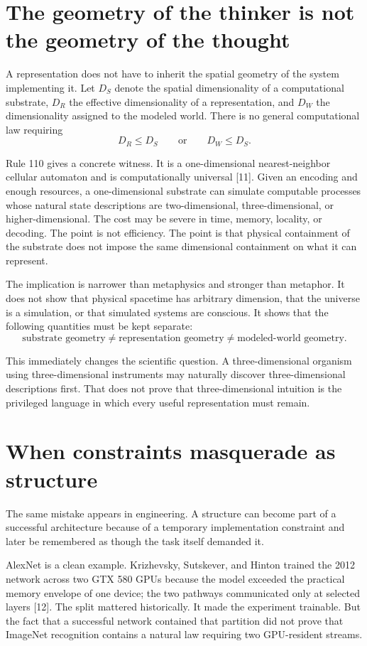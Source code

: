 \documentclass[11pt]{article}
\begin{document}
\section{The geometry of the thinker is not the geometry of the thought}
A representation does not have to inherit the spatial geometry of the system implementing it. Let $D_S$ denote the spatial dimensionality of a computational substrate, $D_R$ the effective dimensionality of a representation, and $D_W$ the dimensionality assigned to the modeled world. There is no general computational law requiring
\[
D_R\le D_S\qquad\text{or}\qquad D_W\le D_S.
\]

Rule 110 gives a concrete witness. It is a one-dimensional nearest-neighbor cellular automaton and is computationally universal [11]. Given an encoding and enough resources, a one-dimensional substrate can simulate computable processes whose natural state descriptions are two-dimensional, three-dimensional, or higher-dimensional. The cost may be severe in time, memory, locality, or decoding. The point is not efficiency. The point is that physical containment of the substrate does not impose the same dimensional containment on what it can represent.

The implication is narrower than metaphysics and stronger than metaphor. It does not show that physical spacetime has arbitrary dimension, that the universe is a simulation, or that simulated systems are conscious. It shows that the following quantities must be kept separate:
\[
\boxed{\text{substrate geometry}\neq\text{representation geometry}\neq\text{modeled-world geometry}.}
\]

This immediately changes the scientific question. A three-dimensional organism using three-dimensional instruments may naturally discover three-dimensional descriptions first. That does not prove that three-dimensional intuition is the privileged language in which every useful representation must remain.

\section{When constraints masquerade as structure}
The same mistake appears in engineering. A structure can become part of a successful architecture because of a temporary implementation constraint and later be remembered as though the task itself demanded it.

AlexNet is a clean example. Krizhevsky, Sutskever, and Hinton trained the 2012 network across two GTX 580 GPUs because the model exceeded the practical memory envelope of one device; the two pathways communicated only at selected layers [12]. The split mattered historically. It made the experiment trainable. But the fact that a successful network contained that partition did not prove that ImageNet recognition contains a natural law requiring two GPU-resident streams.
\end{document}
